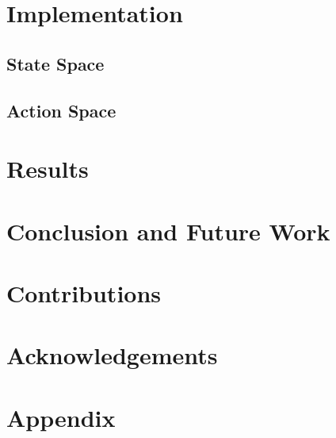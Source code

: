 \documentclass[conference]{IEEEtran}
\begin{document}
\section{Implementation}

\subsection{State Space}
\subsection{Action Space}

\section{Results}


\section{Conclusion and Future Work}

\section{Contributions}

\section{Acknowledgements}

\section{Appendix}





\end{document}
